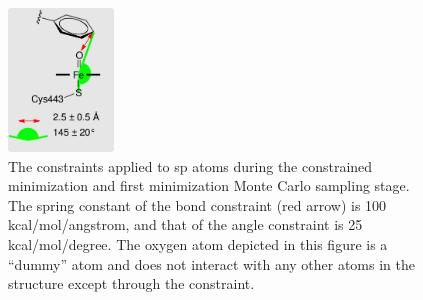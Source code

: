 \begin{figure}[hp]
\centering
\includegraphics[width=0.25\textwidth]{figures/idsite/33b}
\caption{The constraints applied to sp atoms during the constrained minimization and first minimization Monte Carlo sampling stage.
The spring constant of the bond constraint (red arrow) is 100 kcal/mol/angstrom, and that of the angle constraint is 25 kcal/mol/degree.
The oxygen atom depicted in this figure is a ``dummy'' atom and does not interact with any other atoms in the structure except through the constraint.}
\label{figure:first_sp2_constraints}
\end{figure}
